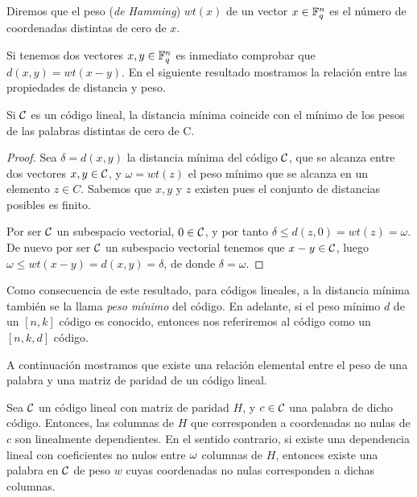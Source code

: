 \begin{definition}
Diremos que el peso (\textit{de Hamming}) \(wt(x)\) de un vector \(x \in \mathbb{F}_q^n\) es el número de coordenadas distintas de cero de \(x\).
\end{definition}

Si tenemos dos vectores \(x, y \in \mathbb{F}_q^n\) es inmediato comprobar que \(d(x,y) = wt(x - y)\). En el siguiente resultado mostramos la relación entre las propiedades de distancia y peso.

\begin{proposition}
Si \(\mathcal{C}\) es un  código lineal, la distancia mínima coincide con el mínimo de los pesos de las palabras distintas de cero de C.

\begin{proof}
Sea \(\delta = d(x,y)\) la distancia mínima del código \(\mathcal{C}\), que se alcanza entre dos vectores \(x, y \in \mathcal{C}\), y \(\omega = wt(z)\) el peso mínimo que se alcanza en un elemento \(z \in C\). Sabemos que \(x, y \) y \(z\) existen pues el conjunto de distancias posibles es finito.

Por ser \(\mathcal{C}\) un subespacio vectorial,  \(0 \in \mathcal{C}\), y por tanto  \(\delta \leq d(z, 0) = wt(z) = \omega\). De nuevo por ser \(\mathcal{C}\) un subespacio vectorial tenemos que \(x-y \in \mathcal{C}\), luego \(\omega \leq wt(x-y) = d(x,y) = \delta\), de donde \(\delta = \omega\).
\end{proof}
\end{proposition}

Como consecuencia de este resultado, para códigos lineales, a la distancia mínima también se la llama \textit{peso mínimo} del código. En adelante, si el peso mínimo \(d\) de un \([n,k]\) código es conocido, entonces nos referiremos al código como un \([n,k,d]\) código.

A continuación mostramos que existe una relación elemental entre el peso de una palabra y una matriz de paridad de un código lineal.

\begin{proposition}
    Sea \(\mathcal{C}\) un código lineal con matriz de paridad \(H\), y \(c \in \mathcal{C}\) una palabra de dicho código. Entonces, las columnas de \(H\) que corresponden a coordenadas no nulas de \(c\) son linealmente dependientes. En el sentido contrario, si existe una dependencia lineal con coeficientes no nulos entre \(\omega\) columnas de  \(H\), entonces existe una palabra en \(\mathcal{C}\) de peso \(w\) cuyas coordenadas no nulas corresponden a dichas columnas.
\end{proposition}

